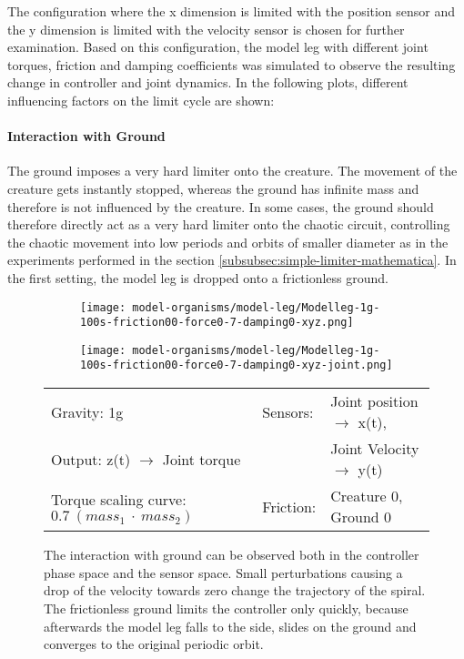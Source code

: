 \documentclass[main]{subfiles}
\begin{document}
The configuration where the x dimension is limited with the position sensor and the y dimension is limited with the velocity sensor is chosen for further examination. %
%
Based on this configuration, the model leg with different joint torques, friction and damping coefficients was simulated to observe the resulting change in controller and joint dynamics. %
%
In the following plots, different influencing factors on the limit cycle are shown:

\paragraph{Interaction with Ground} The ground imposes a very hard limiter onto the creature. %
%
The movement of the creature gets instantly stopped, whereas the ground has infinite mass and therefore is not influenced by the creature. %
%
In some cases, the ground should therefore directly act as a very hard limiter onto the chaotic circuit, controlling the chaotic movement into low periods and orbits of smaller diameter as in the experiments performed in the section \ref{subsubsec:simple-limiter-mathematica}. 
%
In the first setting, the model leg is dropped onto a frictionless ground. 
\begin{figure}[H]
	\centering
		\begin{subfigure}[c]{0.45\textwidth}
	\texttt{[image: model-organisms/model-leg/Modelleg-1g-100s-friction00-force0-7-damping0-xyz.png]}
		\end{subfigure}
	\begin{subfigure}[c]{0.45\textwidth}
	\texttt{[image: model-organisms/model-leg/Modelleg-1g-100s-friction00-force0-7-damping0-xyz-joint.png]}
		\end{subfigure}
	\caption[Limited chaotic controller controlling model leg on frictionless ground.]{The interaction with ground can be observed both in the controller phase space and the sensor space. Small perturbations causing a drop of the velocity towards zero change the trajectory of the spiral. The frictionless ground limits the controller only quickly, because afterwards the model leg falls to the side, slides on the ground and converges to the original periodic orbit.}
	\begin{tabular}{l|ll}
	\hline 
	Gravity: 1g  & Sensors: & Joint position \(\rightarrow\) x(t),\\
	 Output: z(t) \(\rightarrow\) Joint torque &  & Joint Velocity \(\rightarrow\) y(t) \\
	  Torque scaling curve: \(0.7~(mass_1~\cdot~mass_2)\) & Friction: & Creature 0, Ground 0 \\
	  \hline
	\end{tabular}
	
	\label{figure:limited-damped-model-leg-collision1}
\end{figure}
\end{document}
